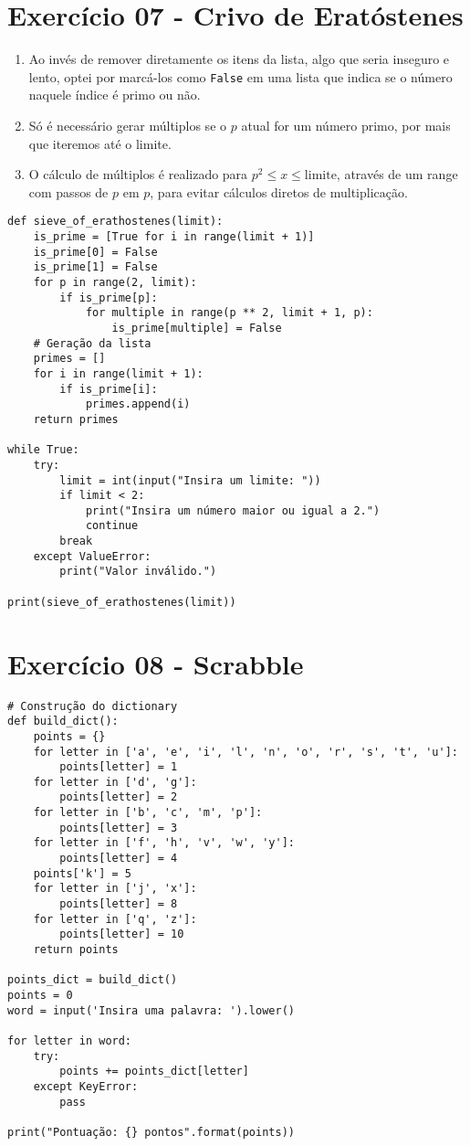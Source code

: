 \documentclass[article, a4paper, oneside, 11pt, english, brazil, sumario=tradicional]{abntex2}
\begin{document}
\newpage
\section{Exercício 07 - Crivo de Eratóstenes}
\label{sec:org047bab5}

\begin{enumerate}
\item Ao invés de remover diretamente os  itens da lista, algo que seria inseguro e
lento, optei por marcá-los  como \texttt{False} em uma lista que  indica se o número
naquele índice é primo ou não.
\item Só é necessário gerar múltiplos se o  \(p\) atual for um número primo, por mais
que iteremos até o limite.
\item O  cálculo de múltiplos é  realizado para \(p^2 \leq  x \leq \textrm{limite}\),
através de um range com passos de \(p\) em \(p\), para evitar cálculos diretos de
multiplicação.
\end{enumerate}

\begin{verbatim}
def sieve_of_erathostenes(limit):
    is_prime = [True for i in range(limit + 1)]
    is_prime[0] = False
    is_prime[1] = False
    for p in range(2, limit):
        if is_prime[p]:
            for multiple in range(p ** 2, limit + 1, p):
                is_prime[multiple] = False
    # Geração da lista
    primes = []
    for i in range(limit + 1):
        if is_prime[i]:
            primes.append(i)
    return primes

while True:
    try:
        limit = int(input("Insira um limite: "))
        if limit < 2:
            print("Insira um número maior ou igual a 2.")
            continue
        break
    except ValueError:
        print("Valor inválido.")

print(sieve_of_erathostenes(limit))
\end{verbatim}

\newpage
\section{Exercício 08 - Scrabble}
\label{sec:org66ea7c8}

\begin{verbatim}
# Construção do dictionary
def build_dict():
    points = {}
    for letter in ['a', 'e', 'i', 'l', 'n', 'o', 'r', 's', 't', 'u']:
        points[letter] = 1
    for letter in ['d', 'g']:
        points[letter] = 2
    for letter in ['b', 'c', 'm', 'p']:
        points[letter] = 3
    for letter in ['f', 'h', 'v', 'w', 'y']:
        points[letter] = 4
    points['k'] = 5
    for letter in ['j', 'x']:
        points[letter] = 8
    for letter in ['q', 'z']:
        points[letter] = 10
    return points

points_dict = build_dict()
points = 0
word = input('Insira uma palavra: ').lower()

for letter in word:
    try:
        points += points_dict[letter]
    except KeyError:
        pass

print("Pontuação: {} pontos".format(points))
\end{verbatim}
\end{document}
